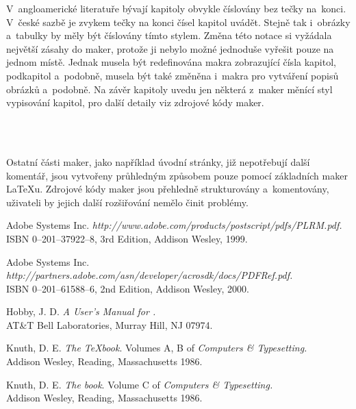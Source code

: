\documentclass[12pt]{article}
\begin{document}
V~angloamerické literatuře bývají kapitoly obvykle číslovány bez tečky
na~konci. V~české sazbě je zvykem tečky na konci čísel kapitol uvádět. Stejně
tak i~obrázky a~tabulky by měly být číslovány tímto stylem. Změna této notace
si vyžádala největší zásahy do maker, protože ji nebylo možné jednoduše vyřešit
pouze na jednom místě. Jednak musela být redefinována makra zobrazující čísla
kapitol, podkapitol a~podobně, 
musela být také změněna i~makra pro vytváření popisů
obrázků a~podobně. Na závěr kapitoly uvedu jen některá z~maker měnící styl
vypisování kapitol, pro další detaily viz zdrojové kódy maker.
\begin{flushleft}
   \\
   \\
\end{flushleft}

Ostatní části maker, jako například úvodní stránky, již nepotřebují další 
komentář, jsou vytvořeny průhledným způsobem pouze pomocí základních 
maker \LaTeX u. Zdrojové kódy maker jsou přehledně strukturovány a~komentovány,
uživateli by jejich další rozšiřování nemělo činit problémy.

\newpage
\begin{thebibliography}{99}

 Adobe Systems Inc.
  \emph{%
    {http://www.adobe.com/products/postscript/pdfs/PLRM.pdf}.} \\
  ISBN 0--201--37922--8, 3rd Edition, Addison Wesley, 1999.

 Adobe Systems Inc.
  \emph{%
    {http://partners.adobe.com/asn/developer/acrosdk/docs/PDFRef.pdf}.} \\
  ISBN 0--201--61588--6, 2nd Edition, Addison Wesley, 2000.

 Hobby, J. D. \emph{A User's Manual for \MP.} \\
  AT\&T Bell Laboratories, Murray Hill, NJ 07974.

 Knuth, D. E. \emph{The \TeX book}.
  Volumes A, B of \emph{Computers \& Typesetting.} \\
  Addison Wesley, Reading, Massachusetts 1986.

 Knuth, D. E. \emph{The \MF book}.
  Volume C of \emph{Computers \& Typesetting.} \\
  Addison Wesley, Reading, Massachusetts 1986.

\end{thebibliography}

\renewcommand{\indexcolumns}{3}
\printindex
\end{document}
